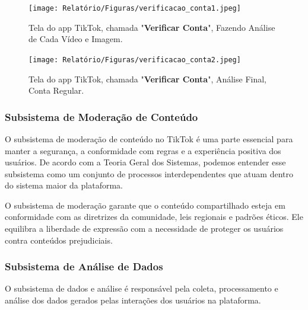 \begin{figure}[H]
    \centering
    \begin{minipage}{0.35\textwidth}
        \centering
        \texttt{[image: Relatório/Figuras/verificacao\_conta1.jpeg]}
        \caption{Tela do app TikTok, chamada "\textbf{Verificar Conta}", Fazendo Análise de Cada Vídeo e Imagem.}
        \label{fig:promover_publicacao1}
    \end{minipage}\hfill
    \begin{minipage}{0.35\textwidth}
        \centering
        \texttt{[image: Relatório/Figuras/verificacao\_conta2.jpeg]}
        \caption{Tela do app TikTok, chamada "\textbf{Verificar Conta}", Análise Final, Conta Regular.}
        \label{fig:promover_publicacao2}
    \end{minipage}
\end{figure}













\newpage
\subsubsection{Subsistema de Moderação de Conteúdo}


O subsistema de moderação de conteúdo no TikTok é uma parte essencial para manter a segurança, a conformidade com regras e a experiência positiva dos usuários. De acordo com a Teoria Geral dos Sistemas, podemos entender esse subsistema como um conjunto de processos interdependentes que atuam dentro do sistema maior da plataforma. \vskip0.3cm

O subsistema de moderação garante que o conteúdo compartilhado esteja em conformidade com as diretrizes da comunidade, leis regionais e padrões éticos. Ele equilibra a liberdade de expressão com a necessidade de proteger os usuários contra conteúdos prejudiciais.







\newpage
\subsubsection{Subsistema de Análise de Dados}

O subsistema de dados e análise é responsável pela coleta, processamento e análise dos dados gerados pelas interações dos usuários na plataforma.\vskip0.3cm


